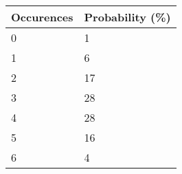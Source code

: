 \begin{tabular}{ll}
Occurences & Probability (\%) \\ 
\hline 
0 & 1 \\ 
1 & 6 \\ 
2 & 17 \\ 
3 & 28 \\ 
4 & 28 \\ 
5 & 16 \\ 
6 & 4 \\ 
\hline 
\end{tabular}
